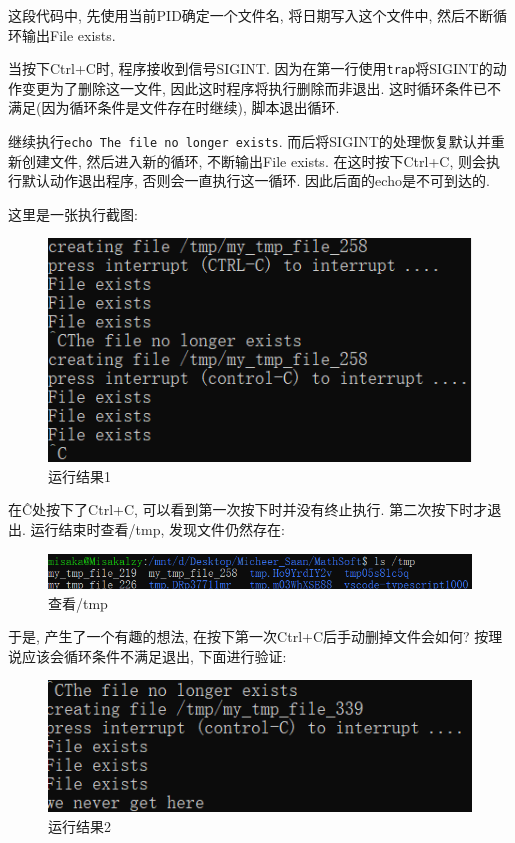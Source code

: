 \documentclass[a4paper]{ctexart}
\begin{document}
这段代码中, 先使用当前PID确定一个文件名, 将日期写入这个文件中, 然后不断循环输出File exists. 

当按下Ctrl+C时, 程序接收到信号SIGINT. 因为在第一行使用\verb|trap|将SIGINT的动作变更为了删除这一文件, 因此这时程序将执行删除而非退出. 这时循环条件已不满足(因为循环条件是文件存在时继续), 脚本退出循环.

继续执行\verb|echo The file no longer exists|. 而后将SIGINT的处理恢复默认并重新创建文件, 然后进入新的循环,  不断输出File exists. 在这时按下Ctrl+C, 则会执行默认动作退出程序, 否则会一直执行这一循环. 因此后面的echo是不可到达的.

这里是一张执行截图:
\begin{figure}[htbp]
    \centering
    \includegraphics[scale=0.8]{HW2_截图.png}
    \caption{运行结果1}
\end{figure} 

在\^C处按下了Ctrl+C, 可以看到第一次按下时并没有终止执行. 第二次按下时才退出.
运行结束时查看/tmp, 发现文件仍然存在:
\begin{figure}[htbp]
    \centering
    \includegraphics[scale=0.8]{HW2_截图1.png}
    \caption{查看/tmp}
\end{figure} 

于是, 产生了一个有趣的想法, 在按下第一次Ctrl+C后手动删掉文件会如何? 按理说应该会循环条件不满足退出, 下面进行验证:
\begin{figure}[htbp]
    \centering
    \includegraphics[scale=0.8]{HW2_截图2.png}
    \caption{运行结果2}
\end{figure} 
\end{document}
